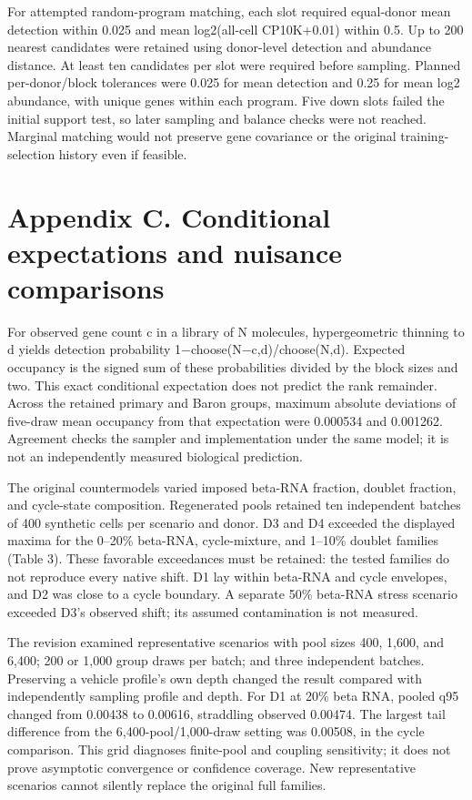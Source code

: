 \documentclass[11pt,letterpaper]{article}
\begin{document}
For attempted random-program matching, each slot required equal-donor mean detection within 0.025 and mean log2(all-cell CP10K+0.01) within 0.5. Up to 200 nearest candidates were retained using donor-level detection and abundance distance. At least ten candidates per slot were required before sampling. Planned per-donor/block tolerances were 0.025 for mean detection and 0.25 for mean log2 abundance, with unique genes within each program. Five down slots failed the initial support test, so later sampling and balance checks were not reached. Marginal matching would not preserve gene covariance or the original training-selection history even if feasible.

\section*{Appendix C. Conditional expectations and nuisance comparisons}
For observed gene count c in a library of N molecules, hypergeometric thinning to d yields detection probability 1−choose(N−c,d)/choose(N,d). Expected occupancy is the signed sum of these probabilities divided by the block sizes and two. This exact conditional expectation does not predict the rank remainder. Across the retained primary and Baron groups, maximum absolute deviations of five-draw mean occupancy from that expectation were 0.000534 and 0.001262. Agreement checks the sampler and implementation under the same model; it is not an independently measured biological prediction.

The original countermodels varied imposed beta-RNA fraction, doublet fraction, and cycle-state composition. Regenerated pools retained ten independent batches of 400 synthetic cells per scenario and donor. D3 and D4 exceeded the displayed maxima for the 0–20\% beta-RNA, cycle-mixture, and 1–10\% doublet families (Table 3). These favorable exceedances must be retained: the tested families do not reproduce every native shift. D1 lay within beta-RNA and cycle envelopes, and D2 was close to a cycle boundary. A separate 50\% beta-RNA stress scenario exceeded D3's observed shift; its assumed contamination is not measured.

The revision examined representative scenarios with pool sizes 400, 1,600, and 6,400; 200 or 1,000 group draws per batch; and three independent batches. Preserving a vehicle profile's own depth changed the result compared with independently sampling profile and depth. For D1 at 20\% beta RNA, pooled q95 changed from 0.00438 to 0.00616, straddling observed 0.00474. The largest tail difference from the 6,400-pool/1,000-draw setting was 0.00508, in the cycle comparison. This grid diagnoses finite-pool and coupling sensitivity; it does not prove asymptotic convergence or confidence coverage. New representative scenarios cannot silently replace the original full families.
\end{document}
